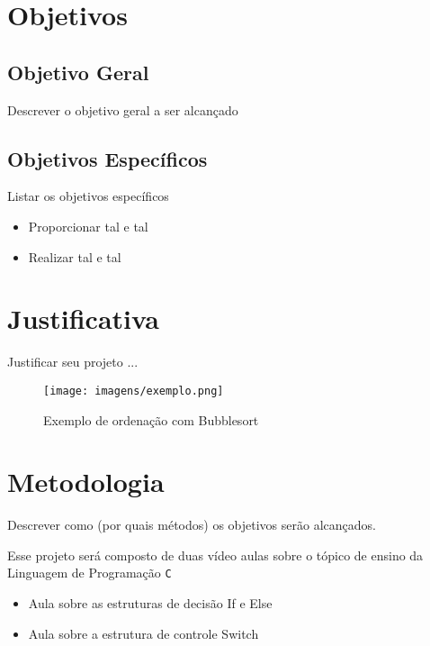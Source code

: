 \documentclass[a4paper,10pt]{article}  %
\begin{document}
\section{Objetivos}

 \subsection{Objetivo Geral}

Descrever o objetivo geral a ser alcançado

 \subsection{Objetivos Específicos}

Listar os objetivos específicos

\begin{itemize}
 \item Proporcionar tal e tal
 \item Realizar tal e tal
\end{itemize}


\section{Justificativa}

Justificar seu projeto ...

\begin{figure}[ht]
\centering
\texttt{[image: imagens/exemplo.png]}
\caption{Exemplo de ordenação com Bubblesort}
\label{fig:xsort}
\end{figure}


\section{Metodologia}

Descrever como (por quais métodos) os objetivos serão alcançados.

 Esse projeto será composto de duas vídeo aulas sobre o tópico de ensino da Linguagem de Programação \texttt{C}

\begin{itemize}

 \item Aula sobre as estruturas de decisão If e Else
 \item Aula sobre a estrutura de controle Switch
\end{itemize}
\end{document}
